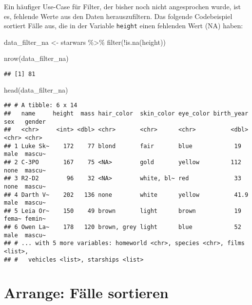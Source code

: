 \documentclass[
]{book}
\newenvironment{Shaded}{\begin{snugshade}}{\end{snugshade}}
\newcommand{\FunctionTok}[1]{\textcolor[rgb]{0.00,0.00,0.00}{#1}}
\newcommand{\NormalTok}[1]{#1}
\newcommand{\OtherTok}[1]{\textcolor[rgb]{0.56,0.35,0.01}{#1}}
\newcommand{\SpecialCharTok}[1]{\textcolor[rgb]{0.00,0.00,0.00}{#1}}
\begin{document}
Ein häufiger Use-Case für Filter, der bisher noch nicht angesprochen wurde, ist es, fehlende Werte aus den Daten herauszufiltern. Das folgende Codebeispiel sortiert Fälle aus, die in der Variable \texttt{height} einen fehlenden Wert (NA) haben:

\begin{Shaded}
\begin{Highlighting}[]
\NormalTok{data\_filter\_na }\OtherTok{\textless{}{-}}\NormalTok{ starwars }\SpecialCharTok{\%\textgreater{}\%} 
  \FunctionTok{filter}\NormalTok{(}\SpecialCharTok{!}\FunctionTok{is.na}\NormalTok{(height))}

\FunctionTok{nrow}\NormalTok{(data\_filter\_na)}
\end{Highlighting}
\end{Shaded}

\begin{verbatim}
## [1] 81
\end{verbatim}

\begin{Shaded}
\begin{Highlighting}[]
\FunctionTok{head}\NormalTok{(data\_filter\_na)}
\end{Highlighting}
\end{Shaded}

\begin{verbatim}
## # A tibble: 6 x 14
##   name     height  mass hair_color  skin_color eye_color birth_year sex   gender
##   <chr>     <int> <dbl> <chr>       <chr>      <chr>          <dbl> <chr> <chr> 
## 1 Luke Sk~    172    77 blond       fair       blue            19   male  mascu~
## 2 C-3PO       167    75 <NA>        gold       yellow         112   none  mascu~
## 3 R2-D2        96    32 <NA>        white, bl~ red             33   none  mascu~
## 4 Darth V~    202   136 none        white      yellow          41.9 male  mascu~
## 5 Leia Or~    150    49 brown       light      brown           19   fema~ femin~
## 6 Owen La~    178   120 brown, grey light      blue            52   male  mascu~
## # ... with 5 more variables: homeworld <chr>, species <chr>, films <list>,
## #   vehicles <list>, starships <list>
\end{verbatim}

\hypertarget{arrange-fuxe4lle-sortieren}{%
\section{Arrange: Fälle sortieren}\label{arrange-fuxe4lle-sortieren}}
\end{document}
